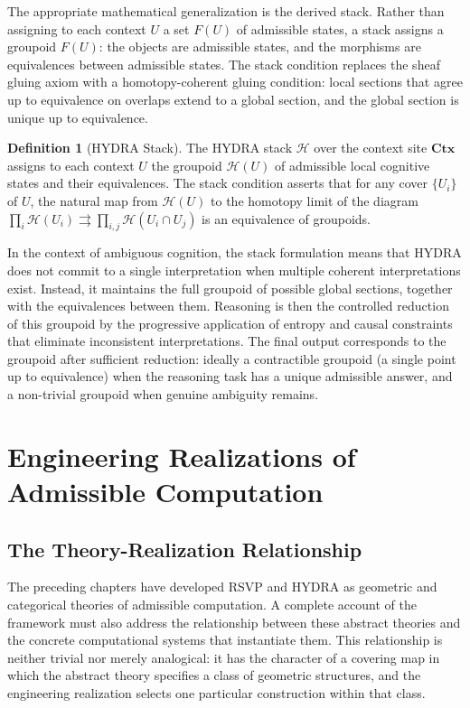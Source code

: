 \documentclass[12pt, a4paper, openany]{book}
\theoremstyle{plain}
\theoremstyle{definition}
\newtheorem{definition}[theorem]{Definition}
\theoremstyle{remark}
\begin{document}
The appropriate mathematical generalization is the derived stack. Rather than assigning to each context $U$ a set $F(U)$ of admissible states, a stack assigns a groupoid $F(U)$: the objects are admissible states, and the morphisms are equivalences between admissible states. The stack condition replaces the sheaf gluing axiom with a homotopy-coherent gluing condition: local sections that agree up to equivalence on overlaps extend to a global section, and the global section is unique up to equivalence.

\begin{definition}[HYDRA Stack]
The HYDRA stack $\mathcal{H}$ over the context site $\mathbf{Ctx}$ assigns to each context $U$ the groupoid $\mathcal{H}(U)$ of admissible local cognitive states and their equivalences. The stack condition asserts that for any cover $\{U_i\}$ of $U$, the natural map from $\mathcal{H}(U)$ to the homotopy limit of the diagram $\prod_i \mathcal{H}(U_i) \rightrightarrows \prod_{i,j} \mathcal{H}(U_i \cap U_j)$ is an equivalence of groupoids.
\end{definition}

In the context of ambiguous cognition, the stack formulation means that HYDRA does not commit to a single interpretation when multiple coherent interpretations exist. Instead, it maintains the full groupoid of possible global sections, together with the equivalences between them. Reasoning is then the controlled reduction of this groupoid by the progressive application of entropy and causal constraints that eliminate inconsistent interpretations. The final output corresponds to the groupoid after sufficient reduction: ideally a contractible groupoid (a single point up to equivalence) when the reasoning task has a unique admissible answer, and a non-trivial groupoid when genuine ambiguity remains.

\chapter{Engineering Realizations of Admissible Computation}

\section{The Theory-Realization Relationship}

The preceding chapters have developed RSVP and HYDRA as geometric and categorical theories of admissible computation. A complete account of the framework must also address the relationship between these abstract theories and the concrete computational systems that instantiate them. This relationship is neither trivial nor merely analogical: it has the character of a covering map in which the abstract theory specifies a class of geometric structures, and the engineering realization selects one particular construction within that class.
\end{document}
